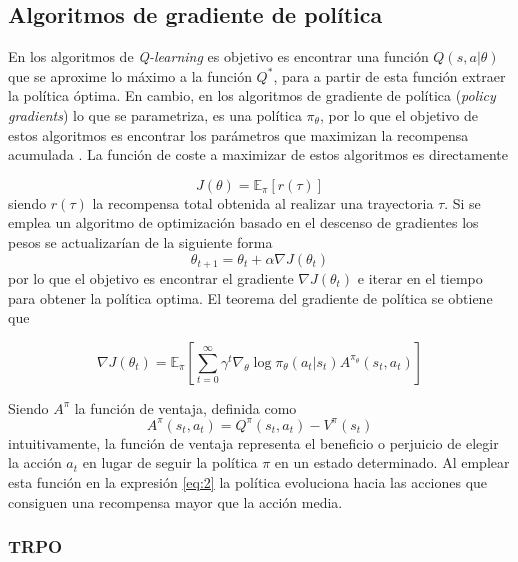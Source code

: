 \subsection{Algoritmos de gradiente de política} \label{ALG_GRAD_POL}

En los algoritmos de \textit{Q-learning} es objetivo es encontrar una función $Q(s,a|\theta)$ que se aproxime lo máximo a la función $Q^*$, para a partir de esta función extraer la política óptima.
En cambio, en los algoritmos de gradiente de política (\textit{policy gradients}) lo que se parametriza, es una política $\pi_\theta$, por lo que el objetivo  de estos algoritmos es encontrar los parámetros que maximizan la recompensa acumulada . La función de coste a maximizar de estos algoritmos es directamente

\begin{equation}
J(\theta)=\mathbb{E}_\pi[r(\tau)]	
\end{equation}
siendo $r(\tau)$ la recompensa total obtenida al realizar una trayectoria $\tau$. Si se emplea un algoritmo de optimización basado en el descenso de gradientes los pesos se actualizarían de la siguiente forma
\begin{equation}
	\theta_{t+1} = \theta_t + \alpha \nabla J (\theta_t)
\end{equation}
por lo que el objetivo es encontrar el gradiente $\nabla J (\theta_t)$ e iterar en el tiempo para obtener la política optima. El teorema del gradiente de política  se obtiene que 

\begin{equation}\label{eq:2}
	\nabla J (\theta_t) = \mathbb{E}_\pi\left[\sum_{t=0}^{\infty}\gamma^t  \nabla_\theta \log \pi_\theta(a_t|s_t) A^{\pi_\theta}(s_t,a_t)\right]
\end{equation} 

	Siendo $A^\pi$ la función de ventaja, definida como 
	\begin{equation}
	A^\pi(s_t,a_t)=Q^\pi(s_t,a_t) - V^\pi(s_t)
	\end{equation}
intuitivamente, la función de ventaja representa el beneficio o perjuicio de elegir la acción $a_t$ en lugar de seguir la política $\pi$ en un estado determinado. Al emplear esta función en la expresión \ref{eq:2} la política evoluciona hacia las acciones que consiguen una recompensa mayor que la acción media.

\subsubsection{TRPO}

